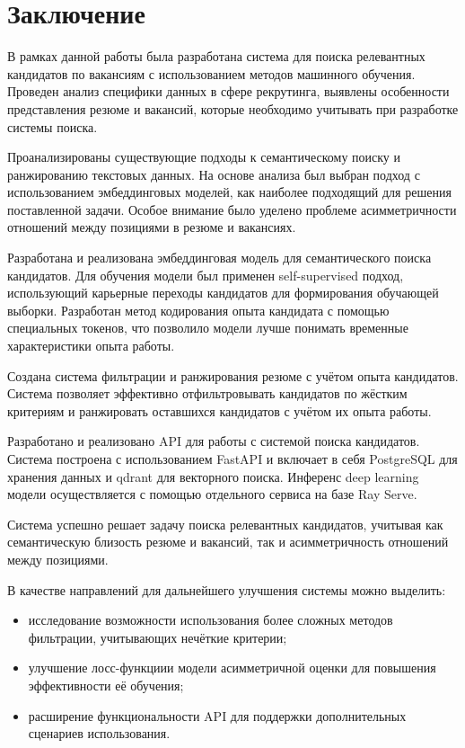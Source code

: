\documentclass[14pt]{mmcs_article}
\begin{document}
\newpage
\section*{Заключение}

В рамках данной работы была разработана система для поиска релевантных кандидатов по вакансиям с использованием методов машинного обучения. Проведен анализ специфики данных в сфере рекрутинга, выявлены особенности представления резюме и вакансий, которые необходимо учитывать при разработке системы поиска.

Проанализированы существующие подходы к семантическому поиску и ранжированию текстовых данных. На основе анализа был выбран подход с использованием эмбеддинговых моделей, как наиболее подходящий для решения поставленной задачи. Особое внимание было уделено проблеме асимметричности отношений между позициями в резюме и вакансиях.

Разработана и реализована эмбеддинговая модель для семантического поиска кандидатов. Для обучения модели был применен self-supervised подход, использующий карьерные переходы кандидатов для формирования обучающей выборки. Разработан метод кодирования опыта кандидата с помощью специальных токенов, что позволило модели лучше понимать временные характеристики опыта работы.

Создана система фильтрации и ранжирования резюме с учётом опыта кандидатов. Система позволяет эффективно отфильтровывать кандидатов по жёстким критериям и ранжировать оставшихся кандидатов с учётом их опыта работы.

Разработано и реализовано API для работы с системой поиска кандидатов. Система построена с использованием FastAPI и включает в себя PostgreSQL для хранения данных и qdrant для векторного поиска. Инференс deep learning модели осуществляется с помощью отдельного сервиса на базе Ray Serve.

Система успешно решает задачу поиска релевантных кандидатов, учитывая как семантическую близость резюме и вакансий, так и асимметричность отношений между позициями.

В качестве направлений для дальнейшего улучшения системы можно выделить:
\begin{itemize}
  \item исследование возможности использования более сложных методов фильтрации, учитывающих нечёткие критерии;
  \item улучшение лосс-функциии модели асимметричной оценки для повышения эффективности её обучения;
  \item расширение функциональности API для поддержки дополнительных сценариев использования.
\end{itemize}
\end{document}
